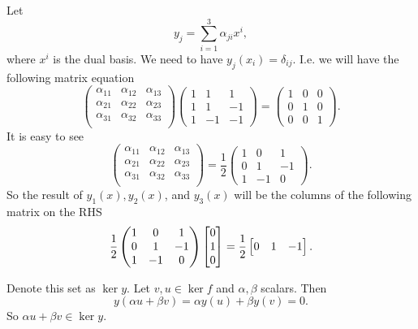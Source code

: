 \begin{problem}
	\begin{solution}
		Let 
		\[ y_j = \sum_{i=1}^{3} \alpha_{ji} x^i, \]
		where $ x^i $ is the dual basis. We need to have $ y_j(x_i) = \delta_{ij} $. I.e. we will have the following matrix equation
		\[ 
		\begin{pmatrix}
			\alpha_{11} & \alpha_{12} & \alpha_{13} \\
			\alpha_{21} & \alpha_{22} & \alpha_{23} \\
			\alpha_{31} & \alpha_{32} & \alpha_{33} \\
		\end{pmatrix}
		\begin{pmatrix}
			1 & 1 & 1 \\
			1 & 1 & -1 \\
			1 & -1 & -1 
		\end{pmatrix}
		= 
		\begin{pmatrix}
			1 & 0 & 0 \\
			0 & 1 & 0 \\
			0 & 0 & 1 
		\end{pmatrix}.
		 \]
		 It is easy to see
		 \[ 
		 \begin{pmatrix}
		 	\alpha_{11} & \alpha_{12} & \alpha_{13} \\
		 	\alpha_{21} & \alpha_{22} & \alpha_{23} \\
		 	\alpha_{31} & \alpha_{32} & \alpha_{33} \\
		 \end{pmatrix}
		 = 
		 \frac{1}{2}\begin{pmatrix}
		 	1 & 0 & 1 \\
		 	0 & 1 & -1 \\
		 	1 & -1 & 0
		 \end{pmatrix}.
		  \]
		  So the result of $ y_1(x),y_2(x) $, and $ y_3(x) $ will be the columns of the following matrix on the RHS
		  \[ 
		  \frac{1}{2}\begin{pmatrix}
		  	1 & 0 & 1 \\
		  	0 & 1 & -1 \\
		  	1 & -1 & 0
		  \end{pmatrix}
		  \begin{bmatrix} 0 \\ 1 \\ 0 \end{bmatrix}
		   = 
		   \frac{1}{2}
		   \begin{bmatrix}
		   	0 & 1 & -1
		   \end{bmatrix}.
		   \]
	\end{solution}
\end{problem}


\begin{problem}
	Denote this set as $ \ker y $. Let $ v,u \in \ker f $ and $ \alpha,\beta $ scalars. Then
	\[ y(\alpha u + \beta v) = \alpha y(u) + \beta y(v) = 0. \]
	So $ \alpha u + \beta v \in \ker y $.
\end{problem}


